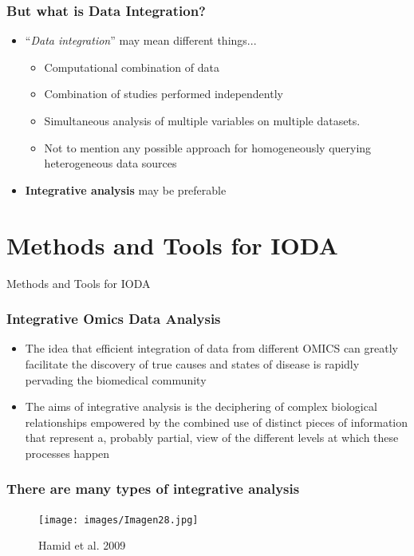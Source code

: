 \documentclass{beamer}
\begin{document}
  
  \begin{frame}
  	\frametitle{But what is Data Integration?}
  	\begin{itemize}
  		\item ``\textit{Data integration}'' may mean different things...
  		\begin{itemize}
  			\item Computational combination of data 
  			\item Combination of studies performed independently
  			\item Simultaneous analysis of multiple variables on multiple datasets.
  			\item Not to mention any possible approach for homogeneously querying heterogeneous data sources
  		\end{itemize}
  		\item \textbf{Integrative analysis} may be preferable
  	\end{itemize}
  \end{frame}
 
 \section{Methods and Tools for IODA}
 
 \begin{frame}
 	\begin{center}
 		{\huge 	Methods and Tools for IODA}
 	\end{center}
 \end{frame}
 
  
  \begin{frame}
  	\frametitle{Integrative Omics Data Analysis}
  	\begin{itemize}
  		\item The idea that efficient integration of data from different OMICS can greatly facilitate the discovery of true causes and states of disease is rapidly pervading the biomedical community
  		\item The aims of integrative analysis is the deciphering of complex biological relationships empowered by the combined use of distinct pieces of information that represent a, probably partial, view of the different levels at which these processes happen
  	\end{itemize}
  \end{frame}
  
  
   \begin{frame}
   	\frametitle{There are many types of integrative analysis}
   		\begin{figure}[ht]
   			\centering
   			\texttt{[image: images/Imagen28.jpg]}
   			\caption{Hamid et al. 2009}
   		\end{figure} 
   \end{frame}
   
\end{document}
